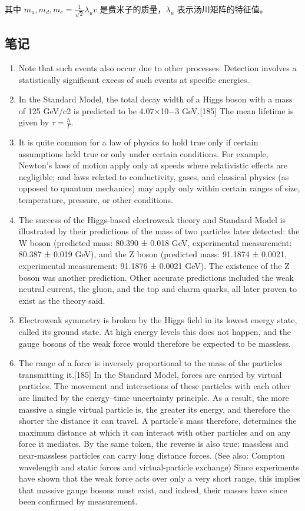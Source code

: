 其中 $m_u, m_d, m_e = \frac{1}{\sqrt{2}} \lambda_u v$ 是费米子的质量，$\lambda_u$ 表示汤川矩阵的特征值。

\subsection{笔记}

\begin{enumerate}
\item Note that such events also occur due to other processes. Detection involves a statistically significant excess of such events at specific energies.
\item In the Standard Model, the total decay width of a Higgs boson with a mass of 125 GeV/c2 is predicted to be 4.07×10−3 GeV.[185] The mean lifetime is given by $\tau = \frac{\hbar}{\Gamma}$.
\item It is quite common for a law of physics to hold true only if certain assumptions held true or only under certain conditions. For example, Newton's laws of motion apply only at speeds where relativistic effects are negligible; and laws related to conductivity, gases, and classical physics (as opposed to quantum mechanics) may apply only within certain ranges of size, temperature, pressure, or other conditions.
\item The success of the Higgs-based electroweak theory and Standard Model is illustrated by their predictions of the mass of two particles later detected: the W boson (predicted mass: 80.390 ± 0.018 GeV, experimental measurement: 80.387 ± 0.019 GeV), and the Z boson (predicted mass: 91.1874 ± 0.0021, experimental measurement: 91.1876 ± 0.0021 GeV). The existence of the Z boson was another prediction. Other accurate predictions included the weak neutral current, the gluon, and the top and charm quarks, all later proven to exist as the theory said.
\item Electroweak symmetry is broken by the Higgs field in its lowest energy state, called its ground state. At high energy levels this does not happen, and the gauge bosons of the weak force would therefore be expected to be massless.
\item The range of a force is inversely proportional to the mass of the particles transmitting it.[185] In the Standard Model, forces are carried by virtual particles. The movement and interactions of these particles with each other are limited by the energy–time uncertainty principle. As a result, the more massive a single virtual particle is, the greater its energy, and therefore the shorter the distance it can travel. A particle's mass therefore, determines the maximum distance at which it can interact with other particles and on any force it mediates. By the same token, the reverse is also true: massless and near-massless particles can carry long distance forces. (See also: Compton wavelength and static forces and virtual-particle exchange) Since experiments have shown that the weak force acts over only a very short range, this implies that massive gauge bosons must exist, and indeed, their masses have since been confirmed by measurement.

\end{enumerate}
